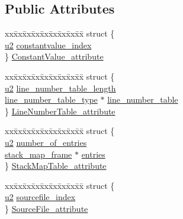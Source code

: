 \subsection*{Public Attributes}
\begin{DoxyCompactItemize}
\item 
\begin{tabbing}
xx\=xx\=xx\=xx\=xx\=xx\=xx\=xx\=xx\=\kill
struct \{\\
\>\hyperlink{structures_8h_a55ef8d87fd202b8417704c089899c5b9}{u2} \hyperlink{unionattribute__types_abec9c5f39e4bfdc4de221e4645d15754}{constantvalue\_index}\\
\} \hyperlink{unionattribute__types_aaecd67000fbd2536ca5290a26b0413b0}{ConstantValue\_attribute}\\

\end{tabbing}\item 
\begin{tabbing}
xx\=xx\=xx\=xx\=xx\=xx\=xx\=xx\=xx\=\kill
struct \{\\
\>\hyperlink{structures_8h_a55ef8d87fd202b8417704c089899c5b9}{u2} \hyperlink{unionattribute__types_acef55ed8e6d377038f26e56398715ba3}{line\_number\_table\_length}\\
\>\hyperlink{structline__number__table__type}{line\_number\_table\_type} $\ast$ \hyperlink{unionattribute__types_af9c522c40e319223069c2aa95863aef1}{line\_number\_table}\\
\} \hyperlink{unionattribute__types_ac8d1e9ca062ca40620b53e65d67b78fd}{LineNumberTable\_attribute}\\

\end{tabbing}\item 
\begin{tabbing}
xx\=xx\=xx\=xx\=xx\=xx\=xx\=xx\=xx\=\kill
struct \{\\
\>\hyperlink{structures_8h_a55ef8d87fd202b8417704c089899c5b9}{u2} \hyperlink{unionattribute__types_a27a78095d45ab77a8670fe3d9c7fd349}{number\_of\_entries}\\
\>\hyperlink{structstack__map__frame}{stack\_map\_frame} $\ast$ \hyperlink{unionattribute__types_ac00cec5af4c5a187ddd975ce5cb2bc46}{entries}\\
\} \hyperlink{unionattribute__types_af40b8d96b4ed7c185e3bbe69ce26d920}{StackMapTable\_attribute}\\

\end{tabbing}\item 
\begin{tabbing}
xx\=xx\=xx\=xx\=xx\=xx\=xx\=xx\=xx\=\kill
struct \{\\
\>\hyperlink{structures_8h_a55ef8d87fd202b8417704c089899c5b9}{u2} \hyperlink{unionattribute__types_a28b4309a74ee5b3ea7d6738538c7a0d1}{sourcefile\_index}\\
\} \hyperlink{unionattribute__types_a4c070f5b3468652a8d4face97c3fc4e8}{SourceFile\_attribute}\\


\end{tabbing}
\end{DoxyCompactItemize}

